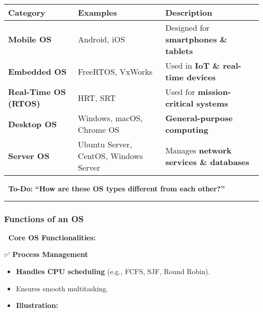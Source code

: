 \documentclass[
]{article}
\makeatletter
\newcommand*\pandocbounded[1]{%
  \sbox\pandoc@box{#1}%
  \Gscale@div\@tempa{\textheight}{\dimexpr\ht\pandoc@box+\dp\pandoc@box\relax}%
  \Gscale@div\@tempb{\linewidth}{\wd\pandoc@box}%
  \ifdim\@tempb\p@<\@tempa\p@\let\@tempa\@tempb\fi%
  \ifdim\@tempa\p@<\p@\scalebox{\@tempa}{\usebox\pandoc@box}%
  \else\usebox{\pandoc@box}%
  \fi%
}
\providecommand{\tightlist}{%
  \setlength{\itemsep}{0pt}\setlength{\parskip}{0pt}}
\makeatother
\begin{document}
\begin{longtable}[]{@{}
  >{\raggedright\arraybackslash}p{}
  >{\raggedright\arraybackslash}p{}
  >{\raggedright\arraybackslash}p{}@{}}
\toprule\noalign{}
\begin{minipage}[b]{\linewidth}\raggedright
\textbf{Category}
\end{minipage} & \begin{minipage}[b]{\linewidth}\raggedright
\textbf{Examples}
\end{minipage} & \begin{minipage}[b]{\linewidth}\raggedright
\textbf{Description}
\end{minipage} \\
\midrule\noalign{}
\endhead
\bottomrule\noalign{}
\endlastfoot
\textbf{Mobile OS} & Android, iOS & Designed for \textbf{smartphones \&
tablets} \\
\textbf{Embedded OS} & FreeRTOS, VxWorks & Used in \textbf{IoT \&
real-time devices} \\
\textbf{Real-Time OS (RTOS)} & HRT, SRT & Used for
\textbf{mission-critical systems} \\
\textbf{Desktop OS} & Windows, macOS, Chrome OS &
\textbf{General-purpose computing} \\
\textbf{Server OS} & Ubuntu Server, CentOS, Windows Server & Manages
\textbf{network services \& databases} \\
\end{longtable}

📌 \textbf{To-Do:} \textbf{``How are these OS types different from each
other?''}

\begin{center}\rule{0.5\linewidth}{0.5pt}\end{center}

\subsubsection{\texorpdfstring{\textbf{Functions of an
OS}}{Functions of an OS}}\label{functions-of-an-os}

📌 \textbf{Core OS Functionalities:}

✅ \textbf{Process Management}

\begin{itemize}
\tightlist
\item
  \textbf{Handles CPU scheduling} (e.g., FCFS, SJF, Round Robin).
\item
  Ensures smooth multitasking.
\item
  \textbf{Illustration:}\\
  \pandocbounded{\texttt{[image: Day\_1\_4.png]}}
\end{itemize}
\end{document}
